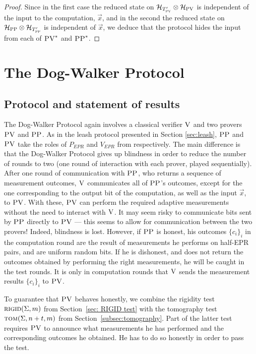 \documentclass[11pt]{article}
\theoremstyle{remark}
\theoremstyle{definition}
\newcommand{\mH}{\mathcal{H}}
\newcommand{\rigid}{\textsc{rigid}}
\newcommand{\tom}{\textsc{tom}}
\newcommand{\ver}{\textsc{V}}
\newcommand{\pv}{\textsc{PV}}
\newcommand{\pp}{\textsc{PP}}
\begin{document}
\begin{proof}
Since in the first case the reduced state on $\mH_{T'_{\pv}} \otimes \mH_\pv$ is independent of the input to the computation, $\vec{x}$, and in the second  the reduced state on $ \mH_\pp\otimes \mH_{T'_{\pp}} $ is independent of $\vec{x}$, we deduce that the protocol hides the input from each of $\pv^*$ and $\pp^*$. 
\end{proof}


\section{The Dog-Walker Protocol}
\label{sec:dog-walker}






\subsection{Protocol and statement of results}

The Dog-Walker Protocol again involves a classical verifier $\ver$ and two provers $\pv$ and $\pp$. As in the leash protocol presented in Section \ref{sec:leash}, $\pp$ and $\pv$ take the roles of $P_{EPR}$ and $V_{EPR}$ from \cite{broadbent15howtoverify} respectively. 
The main difference is that the Dog-Walker Protocol gives up blindness in order to reduce the number of rounds to two (one round of interaction with each prover, played sequentially). After 
one
round of communication with $\pp$, who returns a sequence of measurement outcomes, %
$\ver$ communicates all of $\pp$'s outcomes, except for the one corresponding to the output bit of the computation, as well as the input 
$\vec{x}$,
to $\pv$.  
With 
these, $\pv$ can perform the required adaptive measurements without the need to interact with 
$\ver$.
It may seem %
risky to communicate bits sent by $\pp$ directly to $\pv$ --- this seems to allow for communication between the two provers! Indeed, blindness is lost. However, if $\pp$ is honest, his outcomes $\{c_i\}_i$ in the computation round are the result of measurements he performs on half-EPR pairs, and are uniform random bits. If he is dishonest, and does not return the outcomes  obtained by performing the right measurements, he will be caught in the test rounds. It is only in computation rounds that $\ver$ sends the measurement results $\{c_i\}_i$ to $\pv$. 


To guarantee that $\pv$ behaves honestly, 
we combine the rigidity test $\rigid(\Sigma,m)$ from Section~\ref{sec: RIGID test} with the tomography test $\tom(\Sigma,n+t,m)$ from Section~\ref{subsec:tomography}. Part of the latter test requires $\pv$ to announce
what measurements he has performed and the corresponding outcomes he obtained. He has to do so honestly in order to pass the test.
\end{document}

